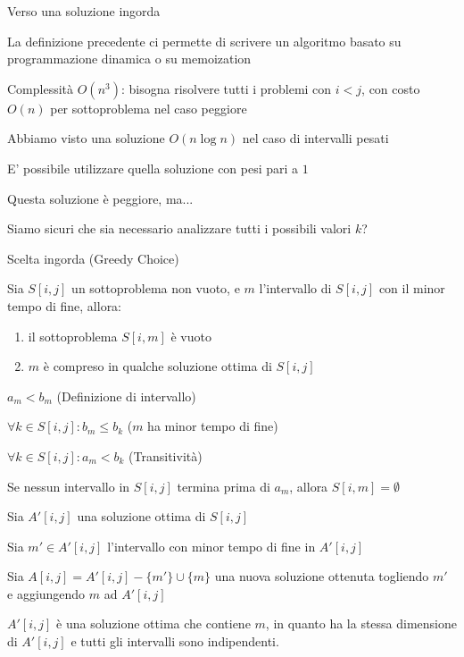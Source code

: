 \begin{frame}{Verso una soluzione ingorda}

\BI
\item La definizione precedente ci permette di scrivere un algoritmo basato su
programmazione dinamica o su memoization
\item Complessità $O(n^3)$: bisogna risolvere tutti i problemi con $i<j$, con
costo $O(n)$ per sottoproblema nel caso peggiore
\EI
{}
\BI
\item Abbiamo visto una soluzione $O(n \log n)$ nel caso di intervalli pesati
\item E' possibile utilizzare quella soluzione con pesi pari a $1$
\item Questa soluzione è peggiore, ma...
\item Siamo sicuri che sia necessario analizzare tutti i possibili valori $k$? 
\EI

\end{frame}

\begin{frame}{Scelta ingorda (Greedy Choice)}

Sia $S[i,j]$ un sottoproblema non vuoto, e $m$ l'intervallo di $S[i,j]$ con il \alert{minor tempo di fine}, allora:
\begin{enumerate}
\item il sottoproblema $S[i,m]$ è vuoto
\item $m$ è compreso in qualche soluzione ottima di $S[i,j]$
\end{enumerate}

\smallskip
\begin{overprint}

\smallskip
{} \alert{$a_m<b_m$} \hfill (Definizione di intervallo)

\smallskip
{} \alert{$\forall k \in S[i,j]: b_m \leq b_k$} \hfill ($m$ ha minor tempo di fine)

\smallskip
{} \alert{$\forall k \in S[i,j]: a_m < b_k$} \hfill (Transitività)

\bigskip
Se nessun intervallo in $S[i,j]$ termina prima di $a_m$, allora $S[i,m] = \emptyset$
\BI
\item Sia \alert{$A'[i,j]$} una soluzione ottima di $S[i,j]$
\item Sia \alert{$m' \in A'[i,j]$} l'intervallo con minor tempo di fine in $A'[i,j]$
\item Sia \alert{$A[i,j] = A'[i,j] - \{ m' \} \cup \{ m \}$} una nuova soluzione
ottenuta togliendo $m'$ e aggiungendo $m$ ad $A'[i,j]$
\item \alert{$A'[i,j]$ è una soluzione ottima che contiene $m$}, in quanto ha la 
stessa dimensione di $A'[i,j]$ e tutti gli intervalli sono indipendenti.
\EI
\end{overprint}

\end{frame}


